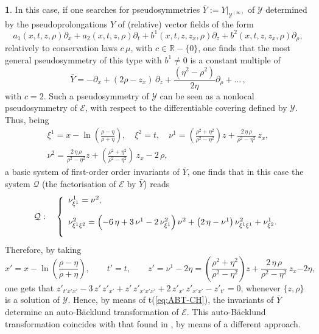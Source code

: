 \documentclass[12pt,english]{elsarticle}
\theoremstyle{plain}
\theoremstyle{plain}
\theoremstyle{remark}
\theoremstyle{plain}
\theoremstyle{definition}
\theoremstyle{definition}
\newtheorem{example}[thm]{\protect\examplename}
\providecommand{\examplename}{Example}
\begin{document}
\begin{example}
In this case, if one searches for pseudosymmetries
$\bar{Y}:=\left .Y\right |_{\mathcal{Y}^{(\infty )}}$ of
$\mathcal{Y}$ determined by the pseudoprolongations $Y$ of (relative) vector
fields of the form
%
\begin{equation*}
a_{1}(x,t,z,\rho )\partial _{x}+a_{2}(x,t,z,\rho )\partial _{t}+b^{1}(x,t,z,z_{x},
\rho )\partial _{z}+b^{2}(x,t,z,z_{x},\rho )\partial _{\rho},
\end{equation*}
%
relatively to conservation laws $c\,\mu $, with
$c\in \mathbb{R}-\{0\}$, one finds that the most general pseudosymmetry
of this type with $b^{1}\neq 0$ is a constant multiple of
%
\begin{equation*}
\bar{Y}=-\partial _{x}+(2\rho -z_{x})\,\partial _{z}+
\frac{\left (\eta ^{2}-\rho ^{2}\right )}{2\eta}\partial _{\rho}+
\ldots \,,
\end{equation*}
%
with $c=2$. Such a pseudosymmetry of $\mathcal{Y}$ can be seen as a nonlocal
pseudosymmetry of $\mathcal{E}$, with respect to the differentiable covering
defined by $\mathcal{Y}$. Thus, being
%
\begin{eqnarray*}[ll]
\xi ^{1}=x-\ln \left (\frac{\rho -\eta}{\rho +\eta}\right ),\quad
\xi ^{2}=t,\quad \nu ^{1}=\left (
\frac{\rho ^{2}+\eta ^{2}}{\rho ^{2}-\eta ^{2}}\right )z+
\frac{2\,\eta \,\rho}{\rho ^{2}-\eta ^{2}}\,z_{x},\\ \nu ^{2}=
\frac{2\,\eta \,\rho}{\rho ^{2}-\eta ^{2}}z+\left (
\frac{\rho ^{2}+\eta ^{2}}{\rho ^{2}-\eta ^{2}}\right )\,z_{x}-2\,\rho,
\end{eqnarray*}
%
a basic system of first-order order invariants of $\bar{Y}$, one finds
that in this case the system $\mathcal{Q}$ (the factorisation of
$\mathcal{E}$ by $\bar{Y}$) reads
%
\begin{equation*}
\mathcal{Q}:\quad \left \{
%
\begin{array}{l}
\nu _{\xi ^{1}}^{1}=\nu ^{2},
\vspace{10pt}
\\
\nu _{\xi ^{1}\xi ^{2}}^{2}=\left (-6\,\eta +3\,\nu ^{1}-2\,\nu _{
\xi ^{1}}^{2}\right )\nu ^{2}+\left (2\,\eta -\nu ^{1}\right )\nu _{
\xi ^{1}\xi ^{1}}^{2}+\nu _{\xi ^{2}}^{1}.
\vspace{10pt}
\end{array}
%
\right .
\end{equation*}
%
Therefore, by taking
%
\begin{equation}
x'=x-\ln \left (\frac{\rho -\eta}{\rho +\eta}\right ),\qquad t'=t,
\qquad z'=\nu ^{1}-2\eta =\left (
\frac{\rho ^{2}+\eta ^{2}}{\rho ^{2}-\eta ^{2}}\right )z+
\frac{2\,\eta \,\rho}{\rho ^{2}-\eta ^{2}}\,z_{x}{-2
\eta},
\label{eq:ABT-CH}
\end{equation}
%
one gets that
$z'_{t'x'x'}-3\,z'\,z'_{x'}+z'\,z'_{x'x'x'}+2\,z'_{x'}\,z'_{x'x'}-z'_{t'}=0$,
whenever $\{z,\rho \}$ is a solution of $\mathcal{Y}$. Hence, by means
of t{(\ref{eq:ABT-CH})}, the invariants of $\bar{Y}$ determine an auto-B\"{a}cklund
transformation of $\mathcal{E}$. This auto-B\"{a}cklund transformation
coincides with that found in \cite{Rasin_Schiff}, by means of a different
approach.
\end{example}
\end{document}
